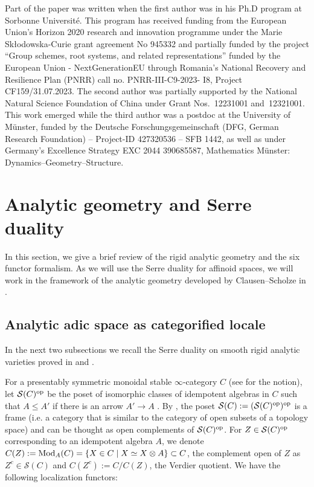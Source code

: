 \documentclass[a4paper,10pt]{amsart}
\theoremstyle{remark}
\theoremstyle{definition}
\theoremstyle{plain}
\numberwithin{equation}{section}
\newcommand{\calS}{{\mathcal S}}
\newcommand{\Mod}{{\rm Mod}}
\begin{document}
Part of the paper was written when the first author was in his Ph.D program at Sorbonne Universit\'e. This program has received funding from the European Union's Horizon 2020 research and innovation programme under the Marie Skłodowska-Curie grant agreement No 945332 and partially funded by the project “Group schemes, root systems, and related representations” funded by the European Union - NextGenerationEU through Romania’s National Recovery and Resilience Plan (PNRR) call no. PNRR-III-C9-2023- I8, Project CF159/31.07.2023. The second author was partially supported by the National Natural Science Foundation of China under Grant Nos.~12231001 and~12321001. This work emerged while the third author was a postdoc at the University of Münster, funded by the Deutsche Forschungsgemeinschaft (DFG, German Research Foundation) – Project-ID 427320536 – SFB 1442, as well as under Germany's Excellence Strategy EXC 2044 390685587, Mathematics Münster: Dynamics–Geometry–Structure.

\section{Analytic geometry and Serre duality}\label{sectionanalytic}
In this section, we give a brief review of the rigid analytic geometry and the six functor formalism. As we will use the Serre duality for affinoid spaces, we will work in the framework of the analytic geometry developed by Clausen--Scholze in \cite{scholze2022complex}.

\subsection{Analytic adic space as categorified locale}

In the next two subsections we recall the Serre duality on smooth rigid analytic varieties proved in \cite{camargo2024analytic} and \cite{Juan2024solidgeometry}. 

For a presentably symmetric monoidal stable $\infty$-category $C$ (see \cite[\S~1]{camargo2024analytic} for the notion), let $\calS(C)^{\rm op}$ be the poset of isomorphic classes of idempotent algebras in $C$ such that $A\leq A'$ if there is an arrow $A'\to A$ \cite[Cons.~5.2]{scholze2022complex}. By \cite[Prop.~5.3]{scholze2022complex}, the poset $\calS(C):=(\calS(C)^{\rm op})^{\rm op}$ is a frame (i.e. a category that is similar to the category of open subsets of a topology space) and can be thought as open complements of $\calS(C)^{\rm op}$. For $Z\in \calS(C)^{\rm op}$ corresponding to an idempotent algebra $A$, we denote $C(Z):=\Mod_A(C)=\{X\in C\mid X\simeq X\otimes A\}\subset C$, the complement open of $Z$ as $Z^c\in \calS(C)$ and $C(Z^c):=C/C(Z)$, the Verdier quotient. We have the following localization functors:
\end{document}
